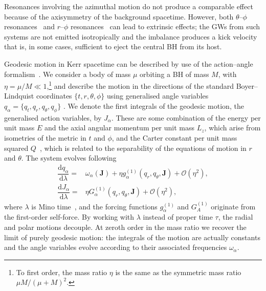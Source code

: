 \documentclass[aps,prd,amsfonts,amssymb,amsmath,nofootinbib,showpacs,superscriptaddress,twocolumn,floatfix]{revtex4-1}
\newcommand{\dd}{\ensuremath{\mathrm{d}}}
\newcommand{\diff}[2]{\ensuremath{\dfrac{\dd {#1}}{\dd {#2}}}}
\newcommand{\order}[1]{\ensuremath{\mathcal{O}({#1})}}
\begin{document}
Resonances involving the azimuthal motion do not produce a comparable effect because of the axisymmetry of the background spacetime. However, both $\theta$--$\phi$ resonances~\cite{Hirata2011} and $r$--$\phi$ resonances~\cite{VanDeMeent2013} can lead to extrinsic effects; the GWs from such systems are not emitted isotropically and the imbalance produces a kick velocity that is, in some cases, sufficient to eject the central BH from its host.

Geodesic motion in Kerr spacetime can be described by use of the action--angle formalism~\cite{Goldstein2002}. %
We consider a body of mass $\mu$ orbiting a BH of mass $M$, with $\eta = \mu/M \ll 1$,\footnote{To first order, the mass ratio $\eta$ is the same as the symmetric mass ratio $\mu M/(\mu+M)^2$.} and describe the motion in the directions of the standard Boyer--Lindquist coordinates $\{t,r,\theta,\phi\}$ using generalised angle variables $q_\alpha = \{q_t,q_r,q_\theta,q_\phi\}$ \citep{Hinderer2008}. We denote the first integrals of the geodesic motion, the generalised action variables, by $J_\alpha$. These are some combination of the energy per unit mass $E$ and the axial angular momentum per unit mass $L_z$, which arise from isometries of the metric in $t$ and $\phi$, and the Carter constant per unit mass squared $Q$~\cite{Carter1968}, which is related to the separability of the equations of motion in $r$ and $\theta$. The system evolves following~\cite{Flanagan2012}
\begin{subequations}
\label{eq:Mino-E-o-M}
\begin{align}
\diff{q_\alpha}{\lambda} = {} & \omega_\alpha(\boldsymbol{J}) + \eta g_\alpha^{(1)}(q_r,q_\theta,\boldsymbol{J}) + \order{\eta^2}, \\
\diff{J_\alpha}{\lambda} = {} & \eta G_\alpha^{(1)}(q_r,q_\theta,\boldsymbol{J}) + \order{\eta^2},
\end{align}
\end{subequations}
where $\lambda$ is Mino time~\cite{Mino2003}, and the forcing functions $g_\alpha^{(1)}$ and $G_A^{(1)}$ originate from the first-order self-force. By working with $\lambda$ instead of proper time $\tau$, the radial and polar motions decouple. At zeroth order in the mass ratio we recover the limit of purely geodesic motion: the integrals of the motion are actually constants and the angle variables evolve according to their associated frequencies $\omega_\alpha$.
\end{document}
